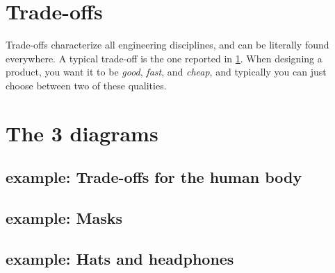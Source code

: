\section{Trade-offs}

Trade-offs characterize all engineering disciplines, and can be literally found everywhere. A typical trade-off is the one reported in \cref{fig:fast_good_cheap}. When designing a product, you want it to be \emph{good}, \emph{fast}, and \emph{cheap}, and typically you can just choose between two of these qualities.

\begin{figure}[h!]
  \begin{center}
  \end{center}
  \caption{}
  \label{fig:fast_good_cheap}
\end{figure}


\section{The 3 diagrams}




\subsection{example: Trade-offs for the human body}


\subsection{example: Masks}



\subsection{example: Hats and headphones}

